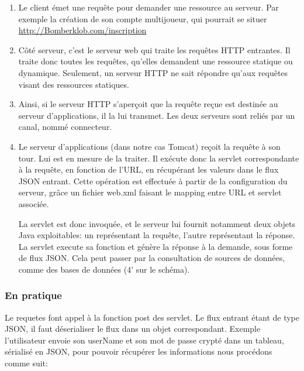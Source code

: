 \documentclass[a4paper,11pt]{report}
\begin{document}
		\begin{enumerate}
		 \item Le client émet une requête pour demander une
			ressource au serveur. Par exemple la création de son compte multijoueur,
			qui pourrait se situer \url{http://Bomberklob.com/inscription}
		\item Côté serveur, c'est le serveur web qui traite les
			requêtes HTTP entrantes. Il traite donc toutes les requêtes, qu'elles
			demandent une ressource statique ou dynamique. Seulement, un serveur HTTP ne
			sait répondre qu'aux requêtes visant des ressources statiques.
		\item Ainsi, si le serveur HTTP s'aperçoit que la requête reçue est destinée
		au serveur d'applications, il la lui transmet. Les deux serveurs sont reliés par un canal, nommé connecteur.
		
		\item Le serveur d'applications (dans notre cas Tomcat) reçoit la requête à
		son tour. Lui est en mesure de la traiter. Il exécute donc la servlet
		correspondante à la requête, en fonction de l'URL, en récupérant les valeurs
		dans le flux JSON entrant. Cette opération est effectuée à partir de la
		configuration du serveur, grâce un fichier web.xml faisant le mapping entre URL et servlet associée. 
		
		La servlet est donc invoquée, et le serveur lui fournit notamment deux objets
		Java exploitables: un représentant la requête, l'autre représentant la réponse.
		La servlet execute sa fonction et génère la réponse à la demande, sous forme
		de flux JSON. Cela peut passer par la consultation de sources de données,
		comme des bases de données (4' sur le schéma).		
		
		\end{enumerate}
		
		
		\subsubsection{En pratique}
		
		Le requetes font appel à la fonction post des servlet. Le flux entrant étant
		de type JSON, il faut déserialiser le flux dans un objet correspondant. Exemple
		l'utilisateur envoie son userName et son mot de passe crypté dans un tableau,
		sérialisé en JSON, pour pouvoir récupérer les informations nous procédons
		comme suit: 
		
\end{document}
